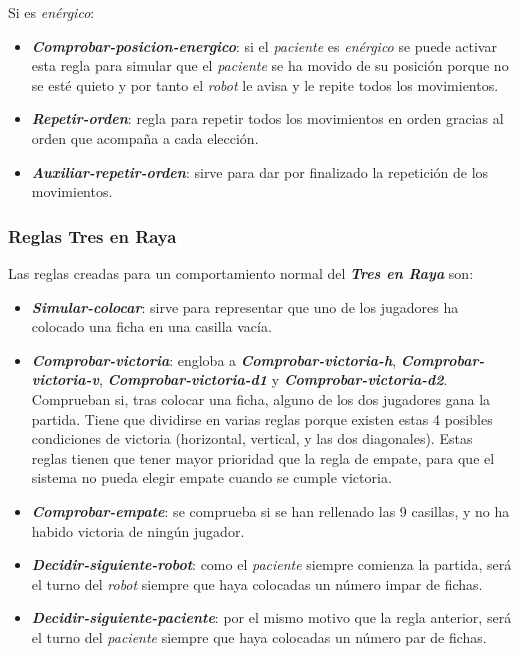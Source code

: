 \documentclass{uc3mpracticas}
\begin{document}
  Si es \textit{enérgico}:

  \begin{itemize}
    \item \textbf{\textit{Comprobar-posicion-energico}}: si el \textit{paciente} es \textit{enérgico} se puede activar esta regla para simular que el \textit{paciente} se ha movido de su posición porque no se esté quieto y por tanto el \textit{robot} le avisa y le repite todos los movimientos.
    \item \textbf{\textit{Repetir-orden}}: regla para repetir todos los movimientos en orden gracias al orden que acompaña a cada elección.
    \item \textbf{\textit{Auxiliar-repetir-orden}}: sirve para dar por finalizado la repetición de los movimientos.
  \end{itemize}



  \subsubsection{Reglas Tres en Raya}

  Las reglas creadas para un comportamiento normal del \textit{\textbf{Tres en Raya}} son:

  \begin{itemize}
    \item \textbf{\textit{Simular-colocar}}: sirve para representar que uno de los jugadores ha colocado una ficha en una casilla vacía.
    \item \textbf{\textit{Comprobar-victoria}}: engloba a \textbf{\textit{Comprobar-victoria-h}}, \textbf{\textit{Comprobar-victoria-v}}, \textbf{\textit{Comprobar-victoria-d1}} y \textbf{\textit{Comprobar-victoria-d2}}. Comprueban si, tras colocar una ficha, alguno de los dos jugadores gana la partida. Tiene que dividirse en varias reglas porque existen estas 4 posibles condiciones de victoria (horizontal, vertical, y las dos diagonales). Estas reglas tienen que tener mayor prioridad que la regla de empate, para que el sistema no pueda elegir empate cuando se cumple victoria.
    \item \textbf{\textit{Comprobar-empate}}: se comprueba si se han rellenado las 9 casillas, y no ha habido victoria de ningún jugador.
    \item \textbf{\textit{Decidir-siguiente-robot}}: como el \textit{paciente} siempre comienza la partida, será el turno del  \textit{robot} siempre que haya colocadas un número impar de fichas.
    \item \textbf{\textit{Decidir-siguiente-paciente}}: por el mismo motivo que la regla anterior, será el turno del \textit{paciente} siempre que haya colocadas un número par de fichas.
  \end{itemize}
\end{document}
